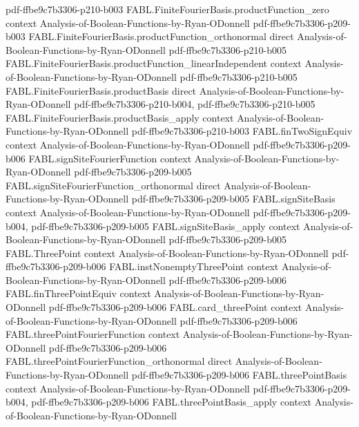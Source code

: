 \begin{theorem}
  {pdf-ffbe9c7b3306-p210-b003}
\proofstep
  {FABL.FiniteFourierBasis.productFunction_zero}
  {context}
  {Analysis-of-Boolean-Functions-by-Ryan-ODonnell}
  {pdf-ffbe9c7b3306-p209-b003}
\proofstep
  {FABL.FiniteFourierBasis.productFunction_orthonormal}
  {direct}
  {Analysis-of-Boolean-Functions-by-Ryan-ODonnell}
  {pdf-ffbe9c7b3306-p210-b005}
\proofstep
  {FABL.FiniteFourierBasis.productFunction_linearIndependent}
  {context}
  {Analysis-of-Boolean-Functions-by-Ryan-ODonnell}
  {pdf-ffbe9c7b3306-p210-b005}
\proofstep
  {FABL.FiniteFourierBasis.productBasis}
  {direct}
  {Analysis-of-Boolean-Functions-by-Ryan-ODonnell}
  {pdf-ffbe9c7b3306-p210-b004,
    pdf-ffbe9c7b3306-p210-b005}
\proofstep
  {FABL.FiniteFourierBasis.productBasis_apply}
  {context}
  {Analysis-of-Boolean-Functions-by-Ryan-ODonnell}
  {pdf-ffbe9c7b3306-p210-b003}
\proofstep
  {FABL.finTwoSignEquiv}
  {context}
  {Analysis-of-Boolean-Functions-by-Ryan-ODonnell}
  {pdf-ffbe9c7b3306-p209-b006}
\proofstep
  {FABL.signSiteFourierFunction}
  {context}
  {Analysis-of-Boolean-Functions-by-Ryan-ODonnell}
  {pdf-ffbe9c7b3306-p209-b005}
\proofstep
  {FABL.signSiteFourierFunction_orthonormal}
  {direct}
  {Analysis-of-Boolean-Functions-by-Ryan-ODonnell}
  {pdf-ffbe9c7b3306-p209-b005}
\proofstep
  {FABL.signSiteBasis}
  {context}
  {Analysis-of-Boolean-Functions-by-Ryan-ODonnell}
  {pdf-ffbe9c7b3306-p209-b004,
    pdf-ffbe9c7b3306-p209-b005}
\proofstep
  {FABL.signSiteBasis_apply}
  {context}
  {Analysis-of-Boolean-Functions-by-Ryan-ODonnell}
  {pdf-ffbe9c7b3306-p209-b005}
\proofstep
  {FABL.ThreePoint}
  {context}
  {Analysis-of-Boolean-Functions-by-Ryan-ODonnell}
  {pdf-ffbe9c7b3306-p209-b006}
\proofstep
  {FABL.instNonemptyThreePoint}
  {context}
  {Analysis-of-Boolean-Functions-by-Ryan-ODonnell}
  {pdf-ffbe9c7b3306-p209-b006}
\proofstep
  {FABL.finThreePointEquiv}
  {context}
  {Analysis-of-Boolean-Functions-by-Ryan-ODonnell}
  {pdf-ffbe9c7b3306-p209-b006}
\proofstep
  {FABL.card_threePoint}
  {context}
  {Analysis-of-Boolean-Functions-by-Ryan-ODonnell}
  {pdf-ffbe9c7b3306-p209-b006}
\proofstep
  {FABL.threePointFourierFunction}
  {context}
  {Analysis-of-Boolean-Functions-by-Ryan-ODonnell}
  {pdf-ffbe9c7b3306-p209-b006}
\proofstep
  {FABL.threePointFourierFunction_orthonormal}
  {direct}
  {Analysis-of-Boolean-Functions-by-Ryan-ODonnell}
  {pdf-ffbe9c7b3306-p209-b006}
\proofstep
  {FABL.threePointBasis}
  {context}
  {Analysis-of-Boolean-Functions-by-Ryan-ODonnell}
  {pdf-ffbe9c7b3306-p209-b004,
    pdf-ffbe9c7b3306-p209-b006}
\proofstep
  {FABL.threePointBasis_apply}
  {context}
  {Analysis-of-Boolean-Functions-by-Ryan-ODonnell}

\end{theorem}
